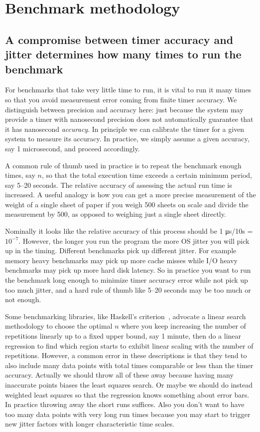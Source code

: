 \documentclass[conference]{IEEEtran}
\begin{document}
\section{Benchmark methodology}


\subsection{A compromise between timer accuracy and jitter determines how many times to run the benchmark}

For benchmarks that take very little time to run, it is vital to run it many times so that you avoid measurement error coming from finite timer accuracy. We distinguish between precision and accuracy here: just because the system may provide a timer with nanosecond precision does not automatically guarantee that it has nanosecond \textit{accuracy}. In principle we can calibrate the timer for a given system to measure its accuracy. In practice, we simply assume a given accuracy, say 1 microsecond, and proceed accordingly.

A common rule of thumb used in practice is to repeat the benchmark enough times, say $n$, so that the total execution time exceeds a certain minimum period, say 5--20 seconds. The relative accuracy of assessing the actual run time is increased. A useful analogy is how you can get a more precise measurement of the weight of a single sheet of paper if you weigh 500 sheets on scale and divide the measurement by 500, as opposed to weighing just a single sheet directly.

Nominally it looks like the relative accuracy of this process should be 1 μs/10s = $10^{-7}$. However, the longer you run the program the more OS jitter you will pick up in the timing. Different benchmarks pick up different jitter. For example memory heavy benchmarks may pick up more cache misses while I/O heavy benchmarks may pick up more hard disk latency. So in practice you want to run the benchmark long enough to minimize timer accuracy error while not pick up too much jitter, and a hard rule of thumb like 5--20 seconds may be too much or not enough.

Some benchmarking libraries, like Haskell's criterion~\cite{criterion},
advocate a linear search methodology to choose the optimal $n$ where you keep increasing the number of repetitions linearly up to a fixed upper bound, say 1 minute, then do a linear regression to find which region starts to exhibit linear scaling with the number of repetitions. However, a common error in these descriptions is that they tend to also include many data points with total times comparable or less than the timer accuracy. Actually we should throw all of these away because having many inaccurate points biases the least squares search. Or maybe we should do instead weighted least squares so that the regression knows something about error bars. In practice throwing away the short runs suffices. Also you don't want to have too many data points with very long run times because you may start to trigger new jitter factors with longer characteristic time scales.
\end{document}
